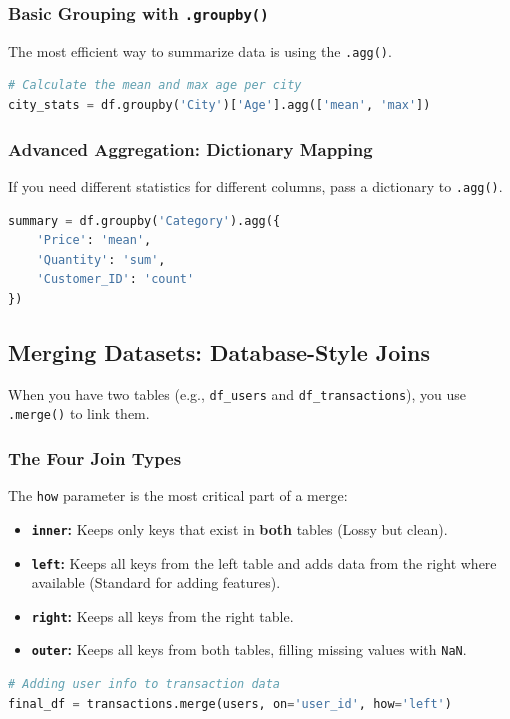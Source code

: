 \documentclass{article}
\begin{document}
\subsubsection{Basic Grouping with \texttt{.groupby()}}
The most efficient way to summarize data is using the \texttt{.agg()}.
\begin{lstlisting}[language=Python]
# Calculate the mean and max age per city
city_stats = df.groupby('City')['Age'].agg(['mean', 'max'])
\end{lstlisting}

\subsubsection{Advanced Aggregation: Dictionary Mapping}
If you need different statistics for different columns, pass a dictionary to \texttt{.agg()}.
\begin{lstlisting}[language=Python]
summary = df.groupby('Category').agg({
    'Price': 'mean',
    'Quantity': 'sum',
    'Customer_ID': 'count'
})
\end{lstlisting}

\subsection{Merging Datasets: Database-Style Joins}
When you have two tables (e.g., \texttt{df\_users} and \texttt{df\_transactions}), you use \texttt{.merge()} to link them.

\subsubsection{The Four Join Types}
The \texttt{how} parameter is the most critical part of a merge:
\begin{itemize}
    \item \textbf{\texttt{inner}:} Keeps only keys that exist in \textbf{both} tables (Lossy but clean).
    \item \textbf{\texttt{left}:} Keeps all keys from the left table and adds data from the right where available (Standard for adding features).
    \item \textbf{\texttt{right}:} Keeps all keys from the right table.
    \item \textbf{\texttt{outer}:} Keeps all keys from both tables, filling missing values with \texttt{NaN}.
\end{itemize}

\begin{lstlisting}[language=Python]
# Adding user info to transaction data
final_df = transactions.merge(users, on='user_id', how='left')
\end{lstlisting}
\end{document}
